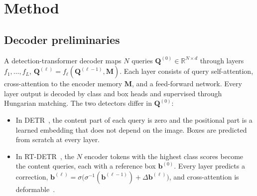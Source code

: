 \documentclass[pdflatex,iicol,sn-basic,Numbered]{sn-jnl}
\begin{document}
\section{Method}\label{sec:method}

\subsection{Decoder preliminaries}
A detection-transformer decoder maps $N$ queries $\mathbf{Q}^{(0)}\in\mathbb{R}^{N\times d}$ through layers $f_1,\dots,f_L$, $\mathbf{Q}^{(\ell)}=f_\ell(\mathbf{Q}^{(\ell-1)},\mathbf{M})$. Each layer consists of query self-attention, cross-attention to the encoder memory $\mathbf{M}$, and a feed-forward network. Every layer output is decoded by class and box heads and supervised through Hungarian matching. The two detectors differ in $\mathbf{Q}^{(0)}$:
\begin{itemize}
\item In DETR~\cite{carion2020detr}, the content part of each query is zero and the positional part is a learned embedding that does not depend on the image. Boxes are predicted from scratch at every layer.
\item In RT-DETR~\cite{zhao2024rtdetr}, the $N$ encoder tokens with the highest class scores become the content queries, each with a reference box $\mathbf{b}^{(0)}$. Every layer predicts a correction, $\mathbf{b}^{(\ell)}=\sigma\big(\sigma^{-1}(\mathbf{b}^{(\ell-1)})+\Delta\mathbf{b}^{(\ell)}\big)$, and cross-attention is deformable~\cite{zhu2021deformable}.
\end{itemize}
\end{document}

